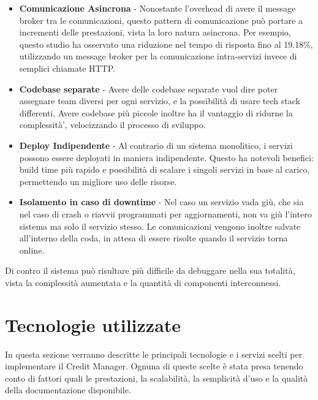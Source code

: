 \begin{itemize}
  \item \textbf{Comunicazione Asincrona} - Nonostante l'overhead di avere il message broker tra le comunicazioni, questo pattern di comunicazione pu\`o portare a incrementi delle prestazioni,
    vista la loro natura asincrona. Per esempio, questo studio\cite{eventdrivenperformance} ha osservato una riduzione nel tempo di risposta fino al 19.18\%, utilizzando un message broker per la comunicazione
    intra-servizi invece di semplici chiamate HTTP.
  \item \textbf{Codebase separate} - Avere delle codebase separate vuol dire poter assegnare team diversi per ogni servizio, e la possibilit\`a di usare tech stack differenti.
    Avere codebase pi\`u piccole inoltre ha il vantaggio di ridurne la complessit\`a', velocizzando il processo di sviluppo.
  \item \textbf{Deploy Indipendente} - Al contrario di un sistema monolitico, i servizi possono essere deployati in maniera indipendente.
    Questo ha notevoli benefici: build time pi\`u rapido e possibilit\`a di scalare i singoli servizi in base al carico, permettendo un migliore uso delle
    risorse.
  \item \textbf{Isolamento in caso di downtime} - Nel caso un servizio vada gi\`u, che sia nel caso di crash o riavvii programmati per aggiornamenti, non va gi\`u l'intero sistema
    ma solo il servizio stesso. Le comunicazioni vengono inoltre salvate all'interno della coda, in attesa di essere risolte quando il servizio torna online.
\end{itemize}
Di contro il sistema pu\`o risultare pi\`u difficile da debuggare nella sua totalit\`a, vista la complessit\`a aumentata e la quantit\`a di componenti interconnessi.

\section{Tecnologie utilizzate}
In questa sezione verranno descritte le principali tecnologie e i servizi scelti per implementare il Credit Manager.
Ognuna di queste scelte \`e stata presa tenendo conto di fattori quali le prestazioni, la scalabilit\`a, la semplicit\`a d'uso e la qualit\`a della documentazione disponibile.

